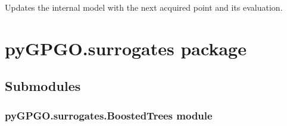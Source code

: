 \documentclass[letterpaper,10pt,english]{sphinxmanual}
\begin{document}
\begin{fulllineitems}
\begin{fulllineitems}
\begin{quote}
\begin{description}
\begin{itemize}
\end{itemize}

\end{description}\end{quote}

\end{fulllineitems}


\begin{fulllineitems}
\label{pyGPGO.GPGO:pyGPGO.GPGO.GPGO.updateGP}
Updates the internal model with the next acquired point and its evaluation.

\end{fulllineitems}


\end{fulllineitems}



\section{pyGPGO.surrogates package}
\label{pyGPGO.surrogates:pygpgo-surrogates-package}\label{pyGPGO.surrogates::doc}

\subsection{Submodules}
\label{pyGPGO.surrogates:submodules}

\subsubsection{pyGPGO.surrogates.BoostedTrees module}
\label{pyGPGO.surrogates.BoostedTrees:module-pyGPGO.surrogates.BoostedTrees}\label{pyGPGO.surrogates.BoostedTrees:pygpgo-surrogates-boostedtrees-module}\label{pyGPGO.surrogates.BoostedTrees::doc}
\end{document}
